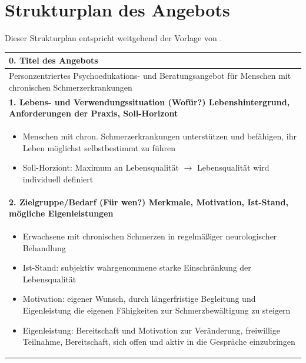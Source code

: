 \documentclass[
  twoside,
  parskip=half-,
  paper=176mm:246mm,
  BCOR=14mm,
  DIV=14,
]{scrreprt}
\begin{document}
\section{Strukturplan des Angebots}\label{strukturplan}
Dieser Strukturplan entspricht weitgehend der Vorlage von \citeauthor[91]{schlutz}.
\begin{center}
  \def\arraystretch{1.5}
  \begin{longtable}{p{}}
    \hline
    \bfseries 0. Titel des Angebots \\\hline
    Personzentriertes Psychoedukations- und Beratungsangebot für Menschen mit chronischen   Schmerzerkrankungen \\\hline
    \bfseries 1. Lebens- und Verwendungssituation (Wofür?) \newline
    Lebenshintergrund, Anforderungen der Praxis, Soll-Horizont \\\hline
    \begin{itemize}[nosep, topsep=-10pt]
    \item	Menschen mit chron. Schmerzerkrankungen unterstützen und befähigen, ihr Leben möglichst selbstbestimmt zu führen
    \item Soll-Horziont: Maximum an Lebensqualität $\rightarrow$ Lebensqualität wird individuell definiert
    \end{itemize} \\\hline
    \bfseries 2. Zielgruppe/Bedarf (Für wen?)\newline
    Merkmale, Motivation, Ist-Stand, mögliche Eigenleistungen \\\hline
    \begin{itemize}[nosep, topsep=-10pt]
    \item	Erwachsene mit chronischen Schmerzen in regelmäßiger neurologischer Behandlung 
    \item	Ist-Stand: subjektiv wahrgenommene starke Einschränkung der Lebensqualität
    \item	Motivation: eigener Wunsch, durch längerfristige Begleitung und Eigenleistung die eigenen Fähigkeiten zur Schmerzbewältigung zu steigern
    \item	Eigenleistung: Bereitschaft und Motivation zur Veränderung, freiwillige Teilnahme, Bereitschaft, sich offen und aktiv in die Gespräche einzubringen
    \end{itemize} \\\hline
    

\end{longtable}
\end{center}
\end{document}
